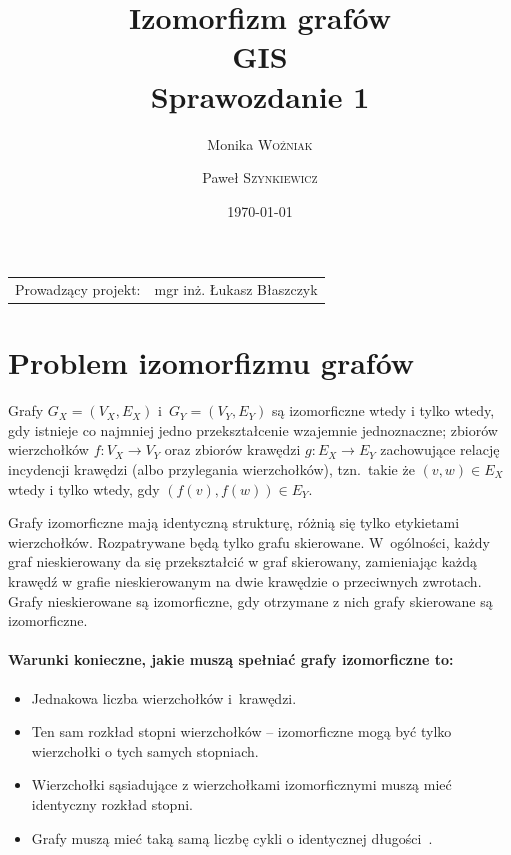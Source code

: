 \documentclass[12pt, a4paper, ]{article} %
\title{Izomorfizm grafów \\ GIS \\ Sprawozdanie 1} %
\author{Monika \textsc{Woźniak} \and Paweł \textsc{Szynkiewicz}} %
\date{\today} %
\begin{document}
\maketitle %

\begin{center}
\begin{tabular}{l r}
Prowadzący projekt: & mgr inż. Łukasz Błaszczyk %
\end{tabular}
\end{center}


\section{Problem izomorfizmu grafów}

Grafy $G_{X}=(V_{X}, E_{X})$ i~$G_{Y}=(V_{Y}, E_{Y})$ są izomorficzne wtedy i
tylko wtedy, gdy istnieje co najmniej jedno przekształcenie wzajemnie
jednoznaczne; zbiorów wierzchołków $f \colon V_{X} \rightarrow V_{Y}$
oraz zbiorów krawędzi $g \colon E_{X} \rightarrow E_{Y}$
zachowujące relację incydencji krawędzi (albo przylegania wierzchołków), tzn.\
takie że $(v,w) \in E_{X}$ wtedy i tylko wtedy, gdy $(f(v),f(w)) \in E_{Y}$.

Grafy izomorficzne mają identyczną strukturę, różnią się tylko etykietami
wierzchołków. Rozpatrywane będą tylko grafu skierowane. W~ogólności, każdy graf
nieskierowany da się przekształcić w graf skierowany, zamieniając każdą krawędź w
grafie nieskierowanym na dwie krawędzie o przeciwnych zwrotach. Grafy
nieskierowane są izomorficzne, gdy otrzymane z nich grafy skierowane są
izomorficzne.

\paragraph*{Warunki konieczne, jakie muszą spełniać grafy izomorficzne to:}
\begin{itemize}
    \item Jednakowa liczba wierzchołków i~krawędzi.
    \item Ten sam rozkład stopni wierzchołków -- izomorficzne mogą być tylko
        wierzchołki o tych samych stopniach.
    \item Wierzchołki sąsiadujące  z wierzchołkami izomorficznymi muszą mieć
        identyczny rozkład stopni.
    \item Grafy muszą mieć taką samą liczbę cykli o identycznej długości~\cite[str.~49]{b:GiS:2013}.
\end{itemize}
\end{document}
